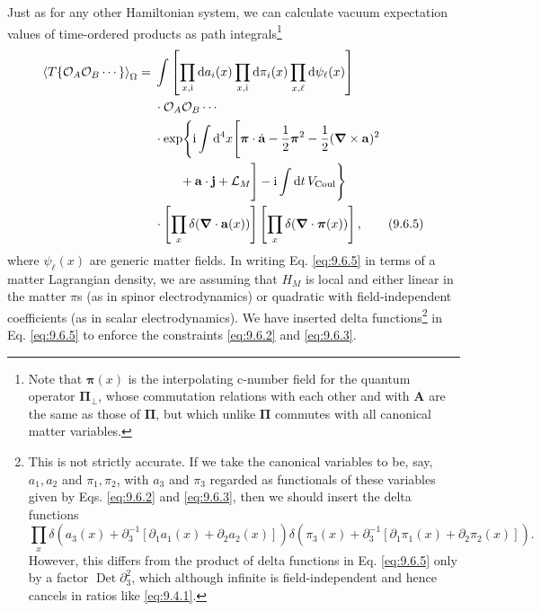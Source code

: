 Just as for any other Hamiltonian system, we can calculate vacuum expectation
values of time-ordered products as path integrals\footnote{Note that
$\boldsymbol\pi(x)$ is the interpolating c-number field for the quantum
operator $\boldsymbol\Pi_\perp$, whose commutation relations with each other
and with $\mathbf A$ are the same as those of $\boldsymbol\Pi$, but which unlike
$\boldsymbol\Pi$ commutes with all canonical matter variables.}
\begin{align}
\left\langle T\{\mathcal O_A\mathcal O_B\cdots\}\right\rangle_{\Omega}
={}&\int\left[\prod_{x,\mathrm{i}}\mathop{}\!\mathrm{d} a_i(x)\prod_{x,\mathrm{i}}\mathop{}\!\mathrm{d}\pi_i(x)
 \prod_{x,\ell}\mathop{}\!\mathrm{d}\psi_\ell(x)\right]
\notag\\
&\cdot\mathcal O_A\mathcal O_B\cdots
\notag\\
&\cdot\exp\Biggl\{\mathrm{i}\int \mathop{}\!\mathrm{d}^4x\Biggl[
 \boldsymbol\pi\cdot\dot{\mathbf a}-\frac12\boldsymbol\pi^2
 -\frac12(\boldsymbol\nabla\times\mathbf a)^2
\notag\\
&\qquad+\mathbf a\cdot\mathbf j+\mathcal L_M\Biggr]
 -\mathrm{i}\int \mathop{}\!\mathrm{d} t\,V_{\mathrm{Coul}}\Biggr\}
\notag\\
&\cdot\left[\prod_x\delta(\boldsymbol\nabla\cdot\mathbf a(x))\right]
 \left[\prod_x\delta(\boldsymbol\nabla\cdot\boldsymbol\pi(x))\right],
\tag{9.6.5}\label{eq:9.6.5}
\end{align}
where $\psi_\ell(x)$ are generic matter fields. In writing Eq. \eqref{eq:9.6.5} in
terms of a matter Lagrangian density, we are assuming that $H_M$ is local and
either linear in the matter $\pi$s (as in spinor electrodynamics) or quadratic
with field-independent coefficients (as in scalar electrodynamics). We have
inserted delta functions\footnote{This is not strictly accurate. If we take
the canonical variables to be, say, $a_1,a_2$ and $\pi_1,\pi_2$, with $a_3$
and $\pi_3$ regarded as functionals of these variables given by Eqs. \eqref{eq:9.6.2}
and \eqref{eq:9.6.3}, then we should insert the delta functions
\[
\prod_x\delta\!\left(a_3(x)+\partial_3^{-1}
 [\partial_1a_1(x)+\partial_2a_2(x)]\right)
\delta\!\left(\pi_3(x)+\partial_3^{-1}
 [\partial_1\pi_1(x)+\partial_2\pi_2(x)]\right).
\]
However, this differs from the product of delta functions in Eq. \eqref{eq:9.6.5} only
by a factor $\operatorname{Det}\partial_3^2$, which although infinite is
field-independent and hence cancels in ratios like \eqref{eq:9.4.1}.} in Eq. \eqref{eq:9.6.5} to
enforce the constraints \eqref{eq:9.6.2} and \eqref{eq:9.6.3}.

